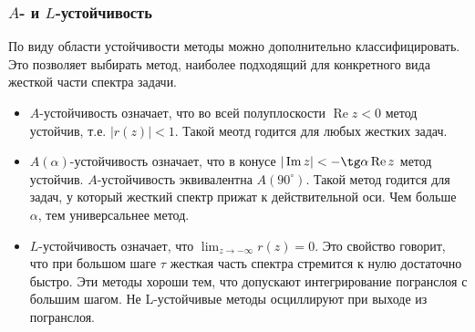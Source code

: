 \documentclass[professionalfonts,compress,unicode,aspectratio=169]{beamer}
\begin{document}
\begin{frame}\frametitle[A- и L- устойчивость]{$A$- и $L$-устойчивость}
	По виду области устойчивости методы можно дополнительно классифицировать. Это позволяет выбирать метод,
	наиболее подходящий для конкретного вида жесткой части спектра задачи.

	\begin{itemize}
		\item $A$-устойчивость означает, что во всей полуплоскости $\operatorname{Re} z < 0$ метод устойчив, т.е. $|r(z)| < 1$.
			Такой меотд годится для любых жестких задач.
		\item $A(\alpha)$-устойчивость означает, что в конусе $|\operatorname{Im} z| < -\tg \alpha \operatorname{Re} z$ метод устойчив. $A$-устойчивость 
		эквивалентна $A(90^\circ)$.
			Такой метод годится для задач, у который жесткий спектр прижат к
действительной оси. Чем больше $\alpha$, тем универсальнее метод.
		\item $L$-устойчивость означает, что $\lim_{z \rightarrow -\infty} r(z) = 0$. Это свойство говорит, что при большом шаге $\tau$ жесткая часть спектра 
		стремится к нулю достаточно быстро.
			Эти методы хороши тем, что допускают интегрирование погранслоя с
большим шагом. Не L-устойчивые методы осциллируют при выходе из погранслоя.
	\end{itemize}
\end{frame}
\end{document}
